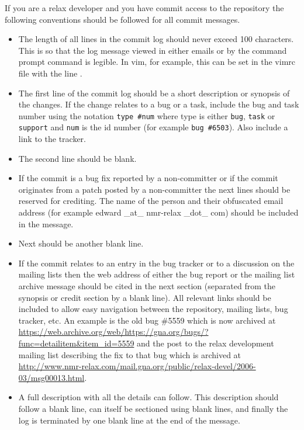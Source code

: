 If you are a relax developer and you have commit access to the repository the following conventions should be followed for all commit messages.
\begin{itemize}
  \item The length of all lines in the commit log should never exceed 100 characters.
    This is so that the log message viewed in either emails or by the command prompt command \mbox{} is legible.
    In vim, for example, this can be set in the vimrc file with the line .
  \item The first line of the commit log should be a short description or synopsis of the changes.
    If the change relates to a bug or a task, include the bug and task number using the notation \texttt{type \#num} where type is either \texttt{bug}, \texttt{task} or \texttt{support} and \texttt{num} is the id number (for example \texttt{bug \#6503}).
    Also include a link to the tracker.
  \item The second line should be blank.
  \item If the commit is a bug fix reported by a non-committer or if the commit originates from a patch posted by a non-committer the next lines should be reserved for crediting.
    The name of the person and their obfuscated email address (for example edward \_at\_ nmr-relax \_dot\_ com) should be included in the message.
  \item Next should be another blank line.
  \item If the commit relates to an entry in the bug tracker or to a discussion on the mailing lists then the web address of either the bug report or the mailing list archive message should be cited in the next section (separated from the synopsis or credit section by a blank line).
    All relevant links should be included to allow easy navigation between the repository, mailing lists, bug tracker, etc.
    An example is the old bug \#5559 which is now archived at \url{https://web.archive.org/web/https://gna.org/bugs/?func=detailitem\&item\_id=5559} and the post to the relax development mailing list describing the fix to that bug which is archived at \url{http://www.nmr-relax.com/mail.gna.org/public/relax-devel/2006-03/msg00013.html}.
  \item A full description with all the details can follow.
    This description should follow a blank line, can itself be sectioned using blank lines, and finally the log is terminated by one blank line at the end of the message.
\end{itemize}


